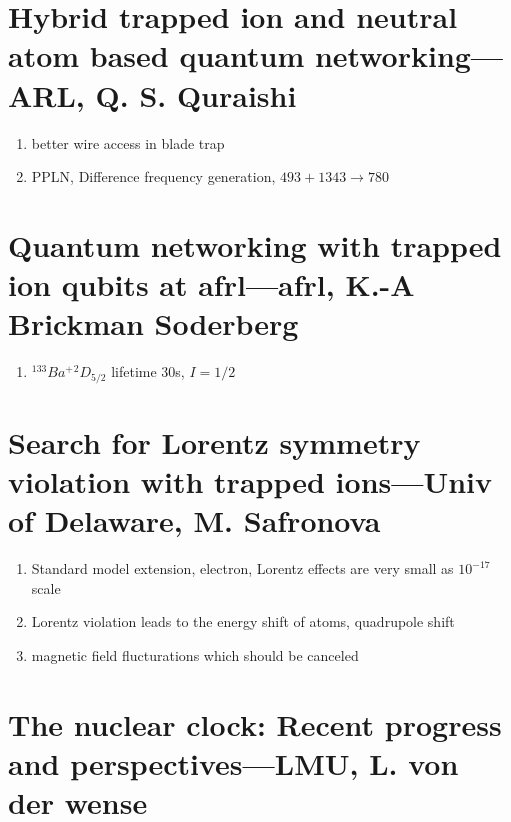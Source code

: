\section{Hybrid trapped ion and neutral atom based quantum networking---ARL, Q. S. Quraishi} %
\label{sec:hybrid_trapped_ion_and_neutral_atom_based_quantum_networking_arl_q_s_quraishi}


\begin{enumerate}
    \item better wire access in blade trap
    \item PPLN, Difference frequency generation, $493+1343\rightarrow 780$
\end{enumerate}


\section{Quantum networking with trapped ion qubits at afrl---afrl, K.-A Brickman Soderberg} %
\label{sec:quantum_networking_with_trapped_ion_qubits_at_afrl_afrl_k_a_brickman_soderberg}

\begin{enumerate}
    \item $^{133}{Ba^+} {^2}D_{5/2}$ lifetime $30$s, $I=1/2$
\end{enumerate}


\section{Search for Lorentz symmetry violation with trapped ions---Univ of Delaware, M. Safronova} %
\label{sec:search_for_lorentz_symmetry_violation_with_trapped_ions_univ_of_delaware_m_safronova}

\begin{enumerate}
    \item Standard model extension, electron, Lorentz effects are very small as $10^{-17}$ scale
    \item Lorentz violation leads to the energy shift of atoms, quadrupole shift
    \item magnetic field flucturations which should be canceled
\end{enumerate}



\section{The nuclear clock: Recent progress and perspectives---LMU, L. von der wense} %
\label{sec:the_nuclear_clock_recent_progress_and_perspectives_lmu_l_von_der_wense}


